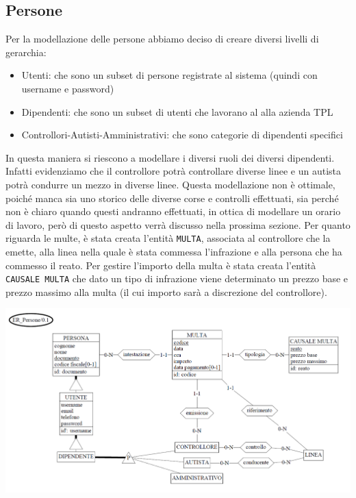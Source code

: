 \documentclass[12pt,a4paper]{report}
\begin{document}
\subsection{Persone}
Per la modellazione delle persone abbiamo deciso di creare diversi livelli di gerarchia:
\begin{itemize}
  \item Utenti: che sono un subset di persone registrate al sistema (quindi con username e password)
  \item Dipendenti: che sono un subset di utenti che lavorano al alla azienda TPL
  \item Controllori-Autisti-Amministrativi: che sono categorie di dipendenti specifici
\end{itemize}
In questa maniera si riescono a modellare i diversi ruoli dei diversi dipendenti. Infatti evidenziamo che il controllore potrà controllare diverse linee e un autista potrà condurre un mezzo in diverse linee. Questa modellazione non è ottimale, poiché manca sia uno storico delle diverse corse e controlli effettuati, sia perché non è chiaro quando questi andranno effettuati, in ottica di modellare un orario di lavoro, però di questo aspetto verrà discusso nella prossima sezione.
Per quanto riguarda le multe, è stata creata l'entità \texttt{MULTA}, associata al controllore che la emette, alla linea nella quale è stata commessa l'infrazione e alla persona che ha commesso il reato. Per gestire l'importo della multa è stata creata l'entità \texttt{CAUSALE MULTA} che dato un tipo di infrazione viene determinato un prezzo base e prezzo massimo alla multa (il cui importo sarà a discrezione del controllore). \\
\begin{centering}
\includegraphics[width=1.0\textwidth]{prog_conc/Persone}
\end{centering}
\end{document}
